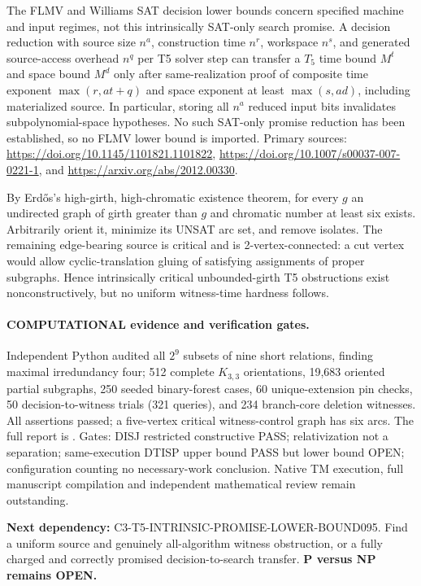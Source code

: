 \documentclass[11pt]{article}
\begin{document}
The FLMV and Williams SAT decision lower bounds concern specified
machine and input regimes, not this intrinsically SAT-only
search promise. A decision reduction with source size $n^a$,
construction time $n^r$, workspace $n^s$, and generated
source-access overhead $n^q$ per T5 solver step can transfer
a $T_5$ time bound $M^t$ and space bound $M^d$ only after
same-realization proof of composite time exponent
$\max(r,at+q)$ and space exponent at least $\max(s,ad)$,
including materialized source. In particular, storing all
$n^a$ reduced input bits invalidates subpolynomial-space
hypotheses. No such SAT-only promise reduction has been
established, so no FLMV lower bound is imported.
Primary sources: \url{https://doi.org/10.1145/1101821.1101822},
\url{https://doi.org/10.1007/s00037-007-0221-1}, and
\url{https://arxiv.org/abs/2012.00330}.

By Erd\H{o}s's high-girth, high-chromatic existence theorem,
for every $g$ an undirected graph of girth greater than $g$
and chromatic number at least six exists. Arbitrarily orient it,
minimize its UNSAT arc set, and remove isolates. The remaining
edge-bearing source is critical and is 2-vertex-connected:
a cut vertex would allow cyclic-translation gluing of satisfying
assignments of proper subgraphs. Hence intrinsically critical
unbounded-girth T5 obstructions exist nonconstructively, but no
uniform witness-time hardness follows.

\paragraph{COMPUTATIONAL evidence and verification gates.}
Independent Python audited all $2^9$ subsets of nine short
relations, finding maximal irredundancy four; 512 complete
$K_{3,3}$ orientations, 19,683 oriented partial subgraphs,
250 seeded binary-forest cases, 60 unique-extension pin checks,
50 decision-to-witness trials (321 queries), and 234
branch-core deletion witnesses. All assertions passed; a
five-vertex critical witness-control graph has six arcs.
The full report is
.
Gates: DISJ restricted constructive PASS; relativization not a
separation; same-execution DTISP upper bound PASS but lower bound OPEN;
configuration counting no necessary-work conclusion.
Native TM execution, full manuscript compilation and independent
mathematical review remain outstanding.

\noindent\textbf{Next dependency:}
C3-T5-INTRINSIC-PROMISE-LOWER-BOUND095.
Find a uniform source and genuinely all-algorithm witness obstruction,
or a fully charged and correctly promised decision-to-search transfer.
\textbf{P versus NP remains OPEN.}
\end{document}
